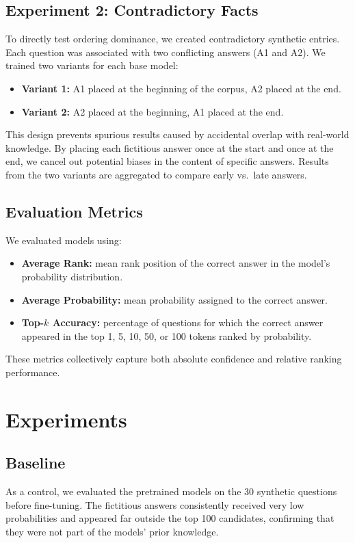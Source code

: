 \documentclass[11pt]{article}
\begin{document}
    \subsection{Experiment 2: Contradictory Facts}
    To directly test ordering dominance, we created contradictory synthetic entries. Each question was associated with two conflicting answers (A1 and A2). We trained two variants for each base model:
    \begin{itemize}
        \item \textbf{Variant 1:} A1 placed at the beginning of the corpus, A2 placed at the end.
        \item \textbf{Variant 2:} A2 placed at the beginning, A1 placed at the end.
    \end{itemize}
    This design prevents spurious results caused by accidental overlap with real-world knowledge. By placing each fictitious answer once at the start and once at the end, we cancel out potential biases in the content of specific answers. Results from the two variants are aggregated to compare early vs.\ late answers.

    \subsection{Evaluation Metrics}
    We evaluated models using:
    \begin{itemize}
        \item \textbf{Average Rank:} mean rank position of the correct answer in the model’s probability distribution.
        \item \textbf{Average Probability:} mean probability assigned to the correct answer.
        \item \textbf{Top-$k$ Accuracy:} percentage of questions for which the correct answer appeared in the top 1, 5, 10, 50, or 100 tokens ranked by probability.
    \end{itemize}
    These metrics collectively capture both absolute confidence and relative ranking performance.

    \section{Experiments}

    \subsection{Baseline}
    As a control, we evaluated the pretrained models on the 30 synthetic questions before fine-tuning. The fictitious answers consistently received very low probabilities and appeared far outside the top 100 candidates, confirming that they were not part of the models’ prior knowledge.
\end{document}

